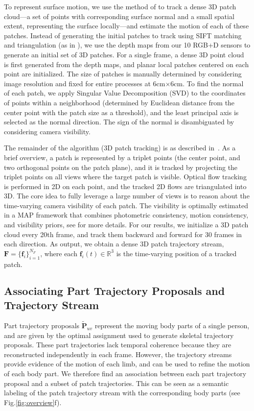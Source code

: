 To represent surface motion, we use the method of \cite{Joo2014} to track a dense 3D patch cloud---a set of points with corresponding surface normal and a small spatial extent, representing the surface locally---and estimate the motion of each of these patches. Instead of generating the initial patches to track using SIFT matching and triangulation (as in \cite{Joo2014}), we use the depth maps from our 10 RGB+D sensors to generate an initial set of 3D patches. For a single frame, a dense 3D point cloud is first generated from the depth maps, and planar local patches centered on each point are initialized. The size of patches is manually determined by considering image resolution and fixed for entire processes at {6cm$\times$6cm}. To find the normal of each patch, we apply Singular Value Decomposition (SVD) to the coordinates of points within a neighborhood (determined by Euclidean distance from the center point with the patch size as a threshold), and the least principal axis is selected as the normal direction. The sign of the normal is disambiguated by considering camera visibility. 

The remainder of the algorithm (3D patch tracking) is as described in~\cite{Joo2014}. As a brief overview, a patch is represented by a triplet points (the center point, and two orthogonal points on the patch plane), and it is tracked by projecting the triplet points on all views where the target patch is visible. Optical flow tracking is performed in 2D on each point, and the tracked 2D flows are triangulated into 3D. The core idea to fully leverage a large number of views is to reason about the time-varying camera visibility of each patch. The visibility is optimally estimated in a MAP framework that combines photometric consistency, motion consistency, and visibility priors, see \cite{Joo2014} for more details. For our results, we initialize a 3D patch cloud every 20th frame, and track them backward and forward for 30 frames in each direction. As output, we obtain a dense 3D patch trajectory stream, $\mathbf{F}=\{\mathbf{f}_i\}_{i=1}^{N_F}$, where each $\mathbf{f}_i(t)\in\mathds{R}^3$ is the time-varying position of a tracked patch.

\subsection{Associating Part Trajectory Proposals and Trajectory Stream}
\label{subsection:trajectoryAssociation}
Part trajectory proposals $\mathbf{\tilde{P}}_{uv}$ represent the moving body parts of a single person, and are given by the optimal assignment used to generate skeletal trajectory proposals. These part trajectories lack temporal coherence because they are reconstructed independently in each frame. However, the trajectory streams provide evidence of the motion of each limb, and can be used to refine the motion of each body part. We therefore find an association between each part trajectory proposal and a subset of patch trajectories. This can be seen as a semantic labeling of the patch trajectory stream with the corresponding body parts (see Fig.\ref{fig:overview}f). 

